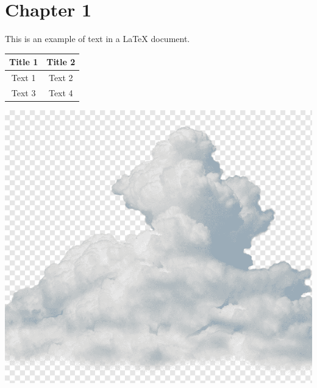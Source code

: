\documentclass{article}
\begin{document}
\section{Chapter 1}

This is an example of text in a LaTeX document.

\begin{tabular}{|c|c|}
\hline
Title 1 & Title 2 \\
\hline
Text 1 & Text 2 \\
\hline
Text 3 & Text 4 \\
\hline
\end{tabular}

\includegraphics{img/cloud.png}
\end{document}
